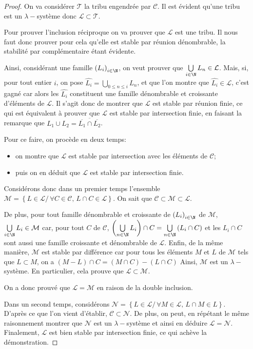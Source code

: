 \begin{proof}
On va considérer $\mathcal{T}$ la tribu engendrée par $\mathcal{C}$. Il est évident qu'une tribu est un $\lambda-$système donc $\mathcal{L} \subset \mathcal{T}$.


Pour prouver l'inclusion réciproque on va prouver que $\mathcal{L}$ est une tribu. Il nous faut donc prouver pour cela qu'elle est stable par réunion dénombrable, la stabilité par complémentaire étant évidente.

Ainsi, considérant une famille $\left(L_i\right)_{i \in \N}$, on veut prouver que $\bigcup \limits_{i \in \N} L_n \in \mathcal{L}$. Mais, si, pour tout entier $i$, on pose $\hat{L_i} = \bigcup \limits_{0 \leq n \leq i} L_n$, et que l'on montre que $\hat{L_i} \in \mathcal{L}$, c'est gagné car alors les $\hat{L_i}$ constituent une famille dénombrable et croissante d'éléments de $\mathcal{L}$. Il s'agit donc de montrer que $\mathcal{L}$ est stable par réunion finie, ce qui est équivalent à prouver que $\mathcal{L}$ est stable par intersection finie, en faisant la remarque que $L_1 \cup L_2 = \overline{\overline{L_1} \cap \overline{L_2}}$.

Pour ce faire, on procède en deux temps:
\begin{itemize}
\item on montre que $\mathcal{L}$ est stable par intersection avec les éléments de $\mathcal{C}$;
\item puis on en déduit que $\mathcal{L}$ est stable par intersection finie.
\end{itemize}

Considérons donc dans un premier temps l'ensemble $\mathcal{M} = \left \{ L \in \mathcal{L}/ \, \forall C \in \mathcal{C}, \, L \cap C \in \mathcal{L} \right \}$. On sait que $\mathcal{C} \subset \mathcal{M} \subset  \mathcal{L}$. 

De plus, pour tout famille dénombrable et croissante de $\left(L_i\right)_{i \in \N}$ de $\mathcal{M}$, $\bigcup \limits_{i \in \N} L_i \in \mathcal{M}$ car, pour tout $C$ de $\mathcal{C}$, $\left(\bigcup \limits_{n \in \N} L_i\right) \cap C = \bigcup \limits_{n \in \N} \left(L_i \cap C\right)$ et les $L_i \cap C$ sont aussi une famille croissante et dénombrable de $\mathcal{L}$. Enfin, de la même manière, $\mathcal{M}$ est stable par différence car pour tous les éléments $M$ et $L$ de $\mathcal{M}$ tels que $L \subset M$, on a $\left(M-L\right) \cap C = \left(M \cap C\right) - \left(L \cap C\right)$ Ainsi, $\mathcal{M}$ est un $\lambda-$système. En particulier, cela prouve que $\mathcal{L} \subset \mathcal{M}$. 

On a donc prouvé que $\mathcal{L} = \mathcal{M}$ en raison de la double inclusion.

Dans un second temps, considérons  $\mathcal{N} = \left \{ L \in \mathcal{L}/ \, \forall  M \in \mathcal{L}, \, L \cap M \in L\right \}$. D'après ce que l'on vient d'établir, $\mathcal{C} \subset \mathcal{N}$. De plus, on peut, en répétant le même raisonnement montrer que $\mathcal{N}$ est un $\lambda-$système et ainsi en déduire $\mathcal{L} = \mathcal{N}$. Finalement, $\mathcal{L}$ est bien stable par intersection finie, ce qui achève la démonstration.
\end{proof}

